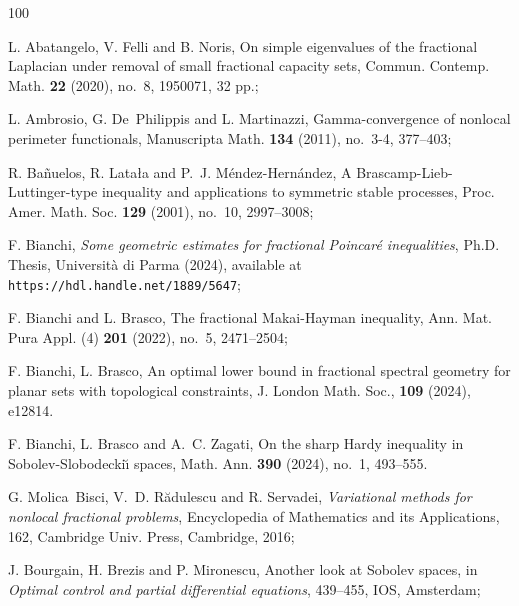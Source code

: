 \documentclass{amsart}
\theoremstyle{definition}
\numberwithin{equation}{section}
\begin{document}
\begin{thebibliography}{100}
	
	 L. Abatangelo, V. Felli and B. Noris, On simple eigenvalues of the fractional Laplacian under removal of small fractional capacity sets, Commun. Contemp. Math. {\bf 22} (2020), no.~8, 1950071, 32 pp.;
	
	
	 L. Ambrosio, G. De~Philippis and L. Martinazzi, Gamma-convergence of nonlocal perimeter functionals, Manuscripta Math. {\bf 134} (2011), no.~3-4, 377--403; 
	
	 R. Ba\~nuelos, R. Lata\l a{} and P.~J. M\'endez-Hern\'andez, A Brascamp-Lieb-Luttinger-type inequality and applications to symmetric stable processes, Proc. Amer. Math. Soc. {\bf 129} (2001), no.~10, 2997--3008;
	
	 F. Bianchi, {\it Some geometric estimates for fractional Poincar\'e inequalities}, Ph.D. Thesis, Universit\`a di Parma (2024), available at {\tt https://hdl.handle.net/1889/5647};
	
	 F. Bianchi and L. Brasco, The fractional Makai-Hayman inequality, Ann. Mat. Pura Appl. (4) {\bf 201} (2022), no.~5, 2471--2504;
	
	 F. Bianchi, L. Brasco, An optimal lower bound in fractional spectral geometry for planar sets with topological constraints, J. London Math. Soc., {\bf 109} (2024), e12814.
	
	 F. Bianchi, L. Brasco and A.~C. Zagati, On the sharp Hardy inequality in Sobolev-Slobodecki\u{\i} spaces, Math. Ann. {\bf 390} (2024), no.~1, 493--555.
	
	 G. Molica~Bisci, V.~D. R\u adulescu and R. Servadei, {\it Variational methods for nonlocal fractional problems}, Encyclopedia of Mathematics and its Applications, 162, Cambridge Univ. Press, Cambridge, 2016; 
	
	
	 J. Bourgain, H. Brezis and P. Mironescu, Another look at Sobolev spaces, in {\it Optimal control and partial differential equations}, 439--455, IOS, Amsterdam;
	

\end{thebibliography}
\end{document}

